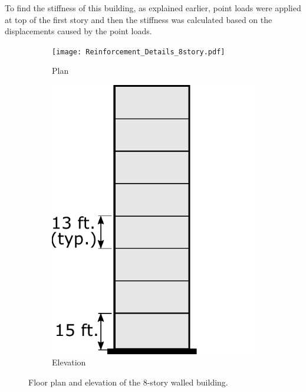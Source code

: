 \documentclass{simcenterdocumentation}
\begin{document}
To find the stiffness of this building, as explained earlier, point loads were applied at top of the first story and then the stiffness was calculated based on the displacements caused by the point loads.

\begin{figure}[H]
	\begin{subfigure}[b]{0.7\linewidth}
		\centering \texttt{[image: Reinforcement\_Details\_8story.pdf]}
		\caption{Plan}	
	\end{subfigure}
	\begin{subfigure}[b]{0.25\linewidth}
		\centering \includegraphics[scale=0.5]{bldg_elevations.pdf}
		\caption{Elevation}
	\end{subfigure}
	\caption{Floor plan and elevation of the 8-story walled building.}
	\label{fig:8_floor_plan}
\end{figure}
\end{document}
